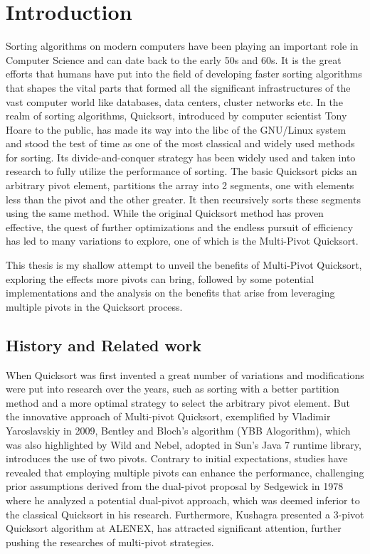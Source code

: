 \documentclass{article}
\begin{document}
\section{Introduction}
Sorting algorithms on modern computers have been playing an important role in Computer Science and can date back to the early 50s and 60s. 
It is the great efforts that humans have put into the field of developing faster sorting algorithms that shapes the vital parts that formed
all the significant infrastructures of the vast computer world like databases, data centers, cluster networks etc.
In the realm of sorting algorithms, Quicksort, introduced by computer scientist Tony Hoare \cite{HoareQuickSort} to the public,
has made its way into the libc of the GNU/Linux system and stood the test of time as one of the most classical and widely used methods for sorting. 
Its divide-and-conquer strategy has been widely used and taken into research to fully utilize the performance of sorting.
The basic Quicksort picks an arbitrary pivot element,
partitions the array into 2 segments, one with elements less than the pivot and the other greater. 
It then recursively sorts these segments using the same method. While the original Quicksort method has proven effective,
the quest of further optimizations and the endless pursuit of efficiency has led to many variations to explore, one of which is the Multi-Pivot Quicksort. 

This thesis is my shallow attempt to unveil the benefits of Multi-Pivot Quicksort, exploring the effects more pivots can bring,
followed by some potential implementations and the analysis on the benefits that arise from leveraging multiple pivots in the Quicksort process.

\subsection{History and Related work}

When Quicksort was first invented a great number of variations and modifications were put into research over the years, 
such as sorting with a better partition method and a more optimal strategy to select the arbitrary pivot element.
But the innovative approach of Multi-pivot Quicksort, exemplified by Vladimir Yaroslavskiy \cite{Yaroslavskiy} in 2009,
Bentley and Bloch's algorithm (YBB Alogorithm), which was also highlighted by Wild and Nebel, adopted in Sun's Java 7 runtime library, 
introduces the use of two pivots. Contrary to initial expectations, studies have revealed that employing multiple pivots can enhance the performance,
challenging prior assumptions derived from the dual-pivot proposal by Sedgewick \cite{Sedgewick} in 1978 where he analyzed a potential dual-pivot approach, 
which was deemed inferior to the classical Quicksort in his research. Furthermore, Kushagra presented a 3-pivot Quicksort \cite{Kushagra} algorithm at ALENEX,
has attracted significant attention, further pushing the researches of multi-pivot strategies. 
\end{document}
